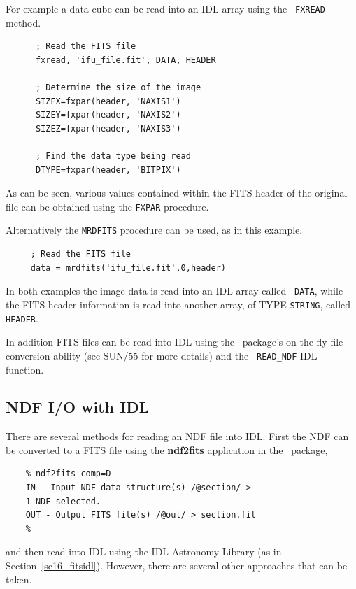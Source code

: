 \documentclass[twoside,11pt]{article}
\newcommand{\htmladdnormallink}[2]{#1}
\newcommand{\latex}[1]{#1}
\newcommand{\xref}[3]{#1}
\newcommand{\xlabel}[1]{}
\begin{document}
For example a data cube can be read into an IDL array using the {\tt
FXREAD} method.

\small\begin{verbatim}
      ; Read the FITS file
      fxread, 'ifu_file.fit', DATA, HEADER
 
      ; Determine the size of the image
      SIZEX=fxpar(header, 'NAXIS1')
      SIZEY=fxpar(header, 'NAXIS2')
      SIZEZ=fxpar(header, 'NAXIS3')
 
      ; Find the data type being read
      DTYPE=fxpar(header, 'BITPIX')
\end{verbatim}\normalsize

As can be seen, various values contained within the FITS header of the
original file can be obtained using the {\tt FXPAR} procedure.

Alternatively the {\tt MRDFITS} procedure can be used, as in this
example.

\small\begin{verbatim}
     ; Read the FITS file
     data = mrdfits('ifu_file.fit',0,header)
\end{verbatim}\normalsize

In both examples the image data is read into an IDL array called {\tt
DATA}, while the FITS header information is read into another array,
of TYPE {\tt STRING}, called {\tt HEADER}.

In addition FITS files can be read into IDL using the
\CONVERTref\normalsize\ package's \xref{on-the-fly file conversion}{sun55}{sect_auto}
ability\latex{ (see SUN/55 for more details)} and the \xref{{\tt
READ\_NDF}}{sun55}{READ_NDF} IDL function.
 
\subsection{\xlabel{sc16_ndfidl}NDF I/O with IDL\label{sc16_ndfidl}}

There are several methods for reading an \xref{NDF}{sun33}{} file into
IDL.  First the NDF can be converted to a FITS file using the
\xref{{\bf ndf2fits}}{sun55}{NDF2FITS} application in the \CONVERTref\
package,

\small\begin{verbatim}
    % ndf2fits comp=D
    IN - Input NDF data structure(s) /@section/ > 
    1 NDF selected.
    OUT - Output FITS file(s) /@out/ > section.fit
    %
\end{verbatim}\normalsize

and then read into IDL using the \htmladdnormallink{IDL Astronomy
Library}{http://idlastro.gsfc.nasa.gov/homepage.html}\latex{ (as
in Section~\ref{sc16_fitsidl})}.  However, there are several other
approaches that can be taken.
\end{document}
